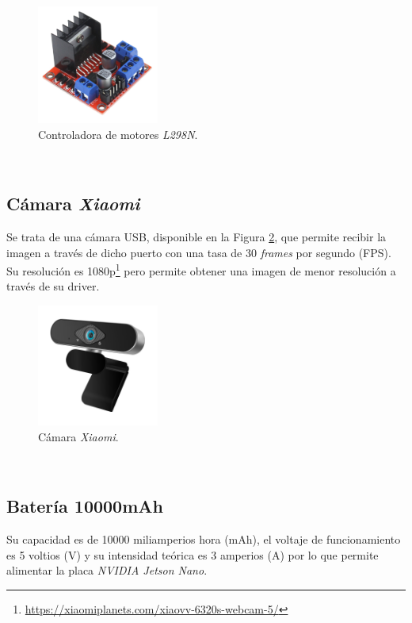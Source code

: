 \begin{figure} [h!]
	\begin{center}
		\includegraphics[width=4cm]{figs/l298n}
	\end{center}
	\caption{Controladora de motores \textit{L298N}.}
	\label{fig:l298n}
\end{figure}\

\subsection{Cámara \textit{Xiaomi}}
\label{subsection:xiaomicamera}
Se trata de una cámara USB, disponible en la Figura \ref{fig:xiaomicamera}, que permite recibir la imagen a través de dicho puerto con una tasa de 30 \textit{frames} por segundo (FPS). Su resolución es 1080p\footnote{\url{https://xiaomiplanets.com/xiaovv-6320s-webcam-5/}} pero permite obtener una imagen de menor resolución a través de su driver.\\

\begin{figure} [h!]
	\begin{center}
		\includegraphics[width=4cm]{figs/camera}
	\end{center}
	\caption{Cámara \textit{Xiaomi}.}
	\label{fig:xiaomicamera}
\end{figure}\

\subsection{Batería 10000mAh}
\label{subsection:battery}
Su capacidad es de 10000 miliamperios hora (mAh), el voltaje de funcionamiento es 5 voltios (V) y su intensidad teórica es 3 amperios (A) por lo que permite alimentar la placa \textit{NVIDIA Jetson Nano}.\\

